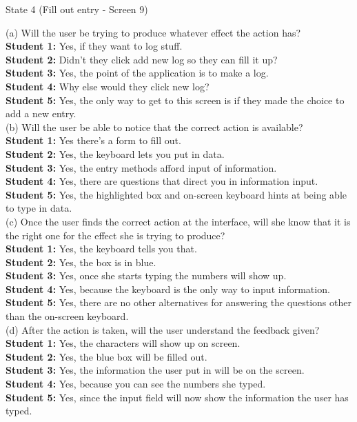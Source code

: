 \documentclass[pdftex,12pt,a4paper]{report}
\begin{document}
\begin{center}
{ \Large State 4 (Fill out entry - Screen 9)}
\end{center}

\noindent(a) Will the user be trying to produce whatever effect the action has?
\\\indent \textbf{Student 1:} Yes, if they want to log stuff.
\\\indent \textbf{Student 2:} Didn't they click add new log so they can fill it up?
\\\indent \textbf{Student 3:} Yes, the point of the application is to make a log.
\\\indent \textbf{Student 4:} Why else would they click new log?
\\\indent \textbf{Student 5:} Yes, the only way to get to this screen is if they made the choice to add a new entry.
\\(b) Will the user be able to notice that the correct action is available?
\\\indent \textbf{Student 1:} Yes there's a form to fill out.
\\\indent \textbf{Student 2:} Yes, the keyboard lets you put in data.
\\\indent \textbf{Student 3:} Yes, the entry methods afford input of information.
\\\indent \textbf{Student 4:} Yes, there are questions that direct you in information input.
\\\indent \textbf{Student 5:} Yes, the highlighted box and on-screen keyboard hints at being able to type in data.
\\(c) Once the user finds the correct action at the interface, will she know that it is the right one for the effect she is trying to produce?
\\\indent \textbf{Student 1:} Yes, the keyboard tells you that.
\\\indent \textbf{Student 2:} Yes, the box is in blue.
\\\indent \textbf{Student 3:} Yes, once she starts typing the numbers will show up. 
\\\indent \textbf{Student 4:} Yes, because the keyboard is the only way to input information.
\\\indent \textbf{Student 5:} Yes, there are no other alternatives for answering the questions other than the on-screen keyboard.
\\(d) After the action is taken, will the user understand the feedback given?
\\\indent \textbf{Student 1:} Yes, the characters will show up on screen.
\\\indent \textbf{Student 2:} Yes, the blue box will be filled out.
\\\indent \textbf{Student 3:} Yes, the information the user put in will be on the screen.
\\\indent \textbf{Student 4:} Yes, because you can see the numbers she typed.
\\\indent \textbf{Student 5:} Yes, since the input field will now show the information the user has typed.
\end{document}
